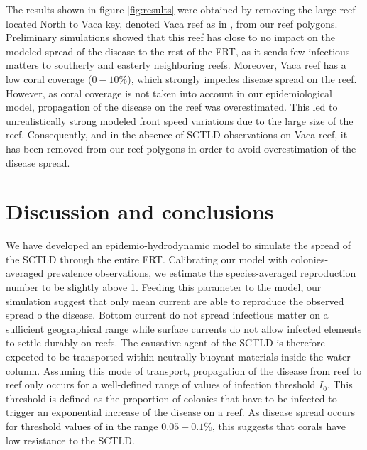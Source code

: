 \documentclass[utf8]{frontiersSCNS}
\begin{document}
The results shown in figure \ref{fig:results} were obtained by removing the large reef located North to Vaca key, denoted Vaca reef as in \cite{frys20}, from our reef polygons. Preliminary simulations showed that this reef has close to no impact on the modeled spread of the disease to the rest of the FRT, as it sends few infectious matters to southerly and easterly neighboring reefs. Moreover, Vaca reef has a low coral coverage ($0-10\%$), which strongly impedes disease spread on the reef. However, as coral coverage is not taken into account in our epidemiological model, propagation of the disease on the reef was overestimated. This led to unrealistically strong modeled front speed variations due to the large size of the reef. Consequently, and in the absence of SCTLD observations on Vaca reef, it has been removed from our reef polygons in order to avoid overestimation of the disease spread.



\section{Discussion and conclusions}


We have developed an epidemio-hydrodynamic model to simulate the spread of the SCTLD through the entire FRT. Calibrating our model with colonies-averaged prevalence observations, we estimate the species-averaged reproduction number to be slightly above 1. Feeding this parameter to the model, our simulation suggest that only mean current are able to reproduce the observed spread o the disease. Bottom current do not spread infectious matter on a sufficient geographical range while surface currents do not allow infected elements to settle durably on reefs. The causative agent of the SCTLD is therefore expected to be transported within neutrally buoyant materials inside the water column. Assuming this mode of transport, propagation of the disease from reef to reef only occurs for a well-defined range of values of infection threshold $I_0$. This threshold is defined as the proportion of colonies that have to be infected to trigger an exponential increase of the disease on a reef. As disease spread occurs for threshold values of in the range $0.05-0.1\%$, this suggests that corals have low resistance to the SCTLD.
\end{document}
